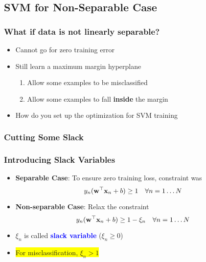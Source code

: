 \documentclass[10pt]{beamer}
\newcommand{\hilight}[1]{\colorbox{yellow}{#1}}
\begin{document}
\subsection{SVM for Non-Separable Case}
\begin{frame}
      {
        \frametitle{What if data is not linearly separable?}
      }
      \begin{itemize}
        \item Cannot go for zero training error
        \item Still learn a maximum margin hyperplane
          \pause
          \begin{enumerate}
          \item Allow some examples to be misclassified
          \item Allow some examples to fall {\bf inside} the margin
          \end{enumerate}
          \pause
        \item How do you set up the optimization for SVM training
      \end{itemize}
\end{frame}
\begin{frame}
    {
      \frametitle{Cutting Some Slack}
    }
    \begin{figure}
      \centering
      
    \end{figure}
\end{frame}
\begin{frame}
\frametitle{Introducing Slack Variables}
\begin{itemize}
  \item {\bf Separable Case}: To ensure zero training loss, constraint was
    \[
    y_n({\bf w}^\top {\bf x}_n + b) \ge 1\quad \forall{n = 1 \ldots N}
    \]
    \pause
  \item {\bf Non-separable Case}: Relax the constraint
    \begin{equation*}
      y_n({\bf w}^\top {\bf x}_n + b) \ge 1-\xi_n\quad \forall{n = 1 \ldots N}
    \end{equation*}
  \item $\xi_n$ is called \textcolor{blue}{\bf slack variable} ($\xi_n \ge 0$)
  \item \hilight{For misclassification, $\xi_n > 1$}
\end{itemize}
\end{frame}
\end{document}

